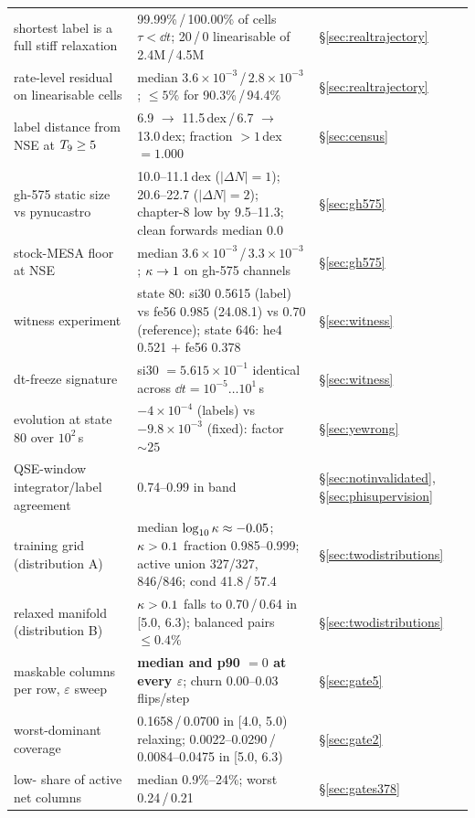 \begin{longtable}{@{}L{6.4cm} L{5.0cm} L{3.2cm}@{}}
shortest label is a full stiff relaxation &
  99.99\%\,/\,100.00\% of cells $\tau < \dd t$; 20\,/\,0 linearisable of
  2.4M\,/\,4.5M & \S\ref{sec:realtrajectory} \\
rate-level residual on linearisable cells &
  median $3.6\times10^{-3}$\,/\,$2.8\times10^{-3}$; $\le 5\%$ for
  90.3\%\,/\,94.4\% & \S\ref{sec:realtrajectory} \\
label distance from NSE at $T_{9} \ge 5$ &
  6.9 $\to$ 11.5\,dex\,/\,6.7 $\to$ 13.0\,dex; fraction $>1$\,dex $= 1.000$ &
  \S\ref{sec:census} \\
gh-575 static size vs pynucastro &
  10.0--11.1\,dex ($|\Delta N| = 1$); 20.6--22.7 ($|\Delta N| = 2$); chapter-8
  low by 9.5--11.3; clean forwards median 0.0 & \S\ref{sec:gh575} \\
stock-MESA \kap{} floor at NSE &
  median $3.6\times10^{-3}$\,/\,$3.3\times10^{-3}$; $\kappa \to 1$ on gh-575
  channels & \S\ref{sec:gh575} \\
witness experiment &
  state 80: si30 0.5615 (label) vs fe56 0.985 (24.08.1) vs 0.70 (reference);
  state 646: he4 0.521 $+$ fe56 0.378 & \S\ref{sec:witness} \\
dt-freeze signature &
  si30 $= 5.615\times10^{-1}$ identical across $\dd t = 10^{-5}\ldots10^{1}$\,s
  & \S\ref{sec:witness} \\
\Ye{} evolution at state 80 over $10^{2}$\,s &
  $-4\times10^{-4}$ (labels) vs $-9.8\times10^{-3}$ (fixed): factor ${\sim}25$
  & \S\ref{sec:yewrong} \\
QSE-window integrator/label agreement &
  0.74--0.99 in band & \S\ref{sec:notinvalidated}, \S\ref{sec:phisupervision} \\
training grid (distribution A) &
  median $\log_{10}\kappa \approx -0.05$; $\kappa > 0.1$ fraction 0.985--0.999;
  active union 327/327, 846/846; cond 41.8\,/\,57.4 &
  \S\ref{sec:twodistributions} \\
relaxed manifold (distribution B) &
  $\kappa > 0.1$ falls to 0.70\,/\,0.64 in [5.0, 6.3); balanced pairs
  $\le 0.4\%$ & \S\ref{sec:twodistributions} \\
maskable columns per row, $\varepsilon$ sweep &
  \textbf{median and p90 $= 0$ at every $\varepsilon$}; churn 0.00--0.03
  flips/step & \S\ref{sec:gate5} \\
worst-dominant coverage &
  0.1658\,/\,0.0700 in [4.0, 5.0) relaxing; 0.0022--0.0290\,/\,0.0084--0.0475
  in [5.0, 6.3) & \S\ref{sec:gate2} \\
low-\kap{} share of active net columns &
  median 0.9\%--24\%; worst 0.24\,/\,0.21 & \S\ref{sec:gates378} \\

\end{longtable}
